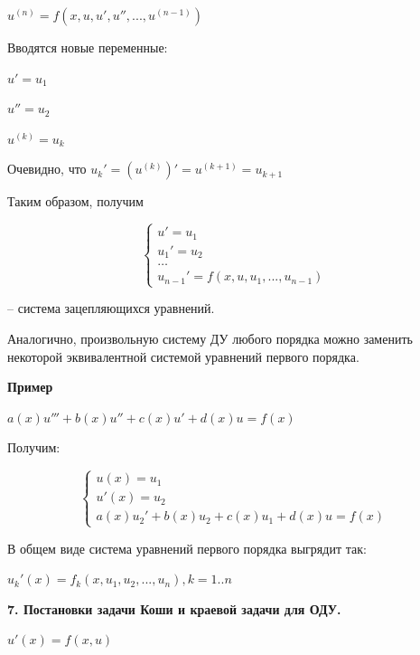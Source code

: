 \documentclass[a4paper,14pt]{article}
\begin{document}
$u^{(n)} = f(x, u, u', u'', ..., u^{(n-1)})$

Вводятся новые переменные:

$u' = u_1$

$u'' = u_2$

$u^{(k)} = u_k$

Очевидно, что $u_k' = (u^{(k)})' = u^{(k + 1)} = u_{k+1}$

Таким образом, получим

\begin{equation*}
	\begin{cases}
		u' = u_1 \\
		u_1' = u_2 \\
		\dots \\
		u_{n-1}' = f(x, u, u_1, ..., u_{n-1})
	\end{cases}
\end{equation*}

-- система зацепляющихся уравнений.

Аналогично, произвольную систему ДУ любого порядка можно
заменить некоторой эквивалентной системой уравнений первого
порядка.

\textbf{Пример}

$a(x) u''' + b(x) u'' + c(x) u' + d(x) u = f(x)$

Получим:

\begin{equation*}
	\begin{cases}
		u(x) = u_1 \\
		u'(x) = u_2 \\
		a(x) u_2' + b(x) u_2 + c(x) u_1 + d(x) u = f(x)
	\end{cases}
\end{equation*}

В общем виде система уравнений первого порядка выгрядит так: 

$u_k'(x) = f_k(x, u_1, u_2, ..., u_n), k = 1..n$

\textbf{7. Постановки задачи Коши и краевой задачи для  ОДУ.}

$u'(x) = f(x, u)$

\begin{figure}[!h]
	\label{fig:sem_int}
\end{figure}
\end{document}
